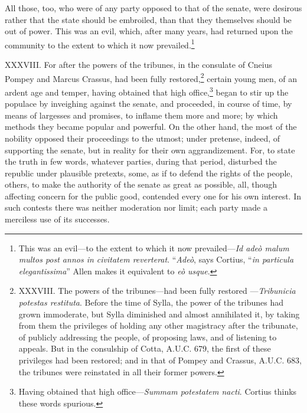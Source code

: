 All those, too, who were of any party opposed to that of the senate,
were desirous rather that the state should be embroiled, than that
they themselves should be out of power. This was an evil, which, after
many years, had returned upon the community to the extent to which it
now prevailed.\footnote{This was an evil—to the extent to which it now prevailed—\emph{Id
adeò malum multos post annos in civitatem reverterat}. ``\emph{Adeò}, says
Cortius, ``\emph{in particula elegantissima}'' Allen makes it equivalent to
\emph{eò usque}.}

XXXVIII. For after the powers of the tribunes, in the consulate of
Cneius Pompey and Marcus Crassus, had been fully restored,\footnote{XXXVIII. The powers of the tribunes—had been fully restored
—\emph{Tribunicia potestas restituta}. Before the time of Sylla,
the power of the tribunes had grown immoderate, but Sylla diminished
and almost annihilated it, by taking from them the privileges of
holding any other magistracy after the tribunate, of publicly
addressing the people, of proposing laws, and of listening to appeals.
But in the consulship of Cotta, A.U.C. 679, the first of these
privileges had been restored; and in that of Pompey and Crassus,
A.U.C. 683, the tribunes were reinstated in all their former powers.}
certain young men, of an ardent age and temper, having obtained that
high office,\footnote{Having obtained that high office—\emph{Summam potestatem nacti}.
Cortius thinks these words spurious.} began to stir up the populace by inveighing against
the senate, and proceeded, in course of time, by means of largesses
and promises, to inflame them more and more; by which methods they
became popular and powerful. On the other hand, the most of the
nobility opposed their proceedings to the utmost; under pretense,
indeed, of supporting the senate, but in reality for their own
aggrandizement. For, to state the truth in few words, whatever
parties, during that period, disturbed the republic under plausible
pretexts, some, as if to defend the rights of the people, others, to
make the authority of the senate as great as possible, all, though
affecting concern for the public good, contended every one for his own
interest. In such contests there was neither moderation nor limit;
each party made a merciless use of its successes.


